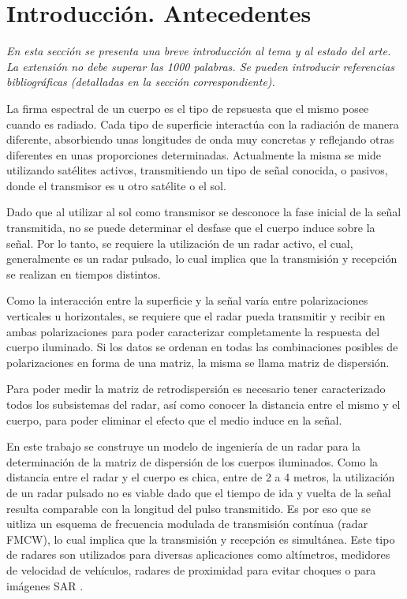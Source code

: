 \chapter{Introducción. Antecedentes} \label{ch:introduction}

\textit{En esta sección se presenta una breve introducción al tema y al estado del arte. La extensión no debe superar las 1000 palabras.
Se pueden introducir referencias bibliográficas (detalladas en la sección correspondiente).}

La firma espectral de un cuerpo es el tipo de repsuesta que el mismo posee cuando es radiado. Cada tipo de superficie interactúa con la radiación de manera diferente, absorbiendo unas longitudes de onda muy concretas y reflejando otras diferentes en unas proporciones determinadas. Actualmente la misma se mide utilizando satélites activos, transmitiendo un tipo de señal conocida, o pasivos, donde el transmisor es u otro satélite o el sol. 

Dado que al utilizar al sol como transmisor se desconoce la fase inicial de la señal transmitida, no se puede determinar el desfase que el cuerpo induce sobre la señal. Por lo tanto, se requiere la utilización de un radar activo, el cual, generalmente es un radar pulsado, lo cual implica que la transmisión y recepción se realizan en tiempos distintos.

Como la interacción entre la superficie y la señal varía entre polarizaciones verticales u horizontales, se requiere que el radar pueda transmitir y recibir en ambas polarizaciones para poder caracterizar completamente la respuesta del cuerpo iluminado. Si los datos se ordenan en todas las combinaciones posibles de polarizaciones en forma de una matriz, la misma se llama matriz de dispersión.

Para poder medir la matriz de retrodispersión es necesario tener caracterizado todos los subsistemas del radar, así como conocer la distancia entre el mismo y el cuerpo, para poder eliminar el efecto que el medio induce en la señal. 

En este trabajo se construye un modelo de ingeniería de un radar para la determinación de la matriz de dispersión de los cuerpos iluminados. Como la distancia entre el radar y el cuerpo es chica, entre de 2 a 4 metros, la utilización de un radar pulsado no es viable dado que el tiempo de ida y vuelta de la señal resulta comparable con la longitud del pulso transmitido. Es por eso que se uitliza un esquema de frecuencia modulada de transmisión contínua (radar FMCW), lo cual implica que la transmisión y recepción es simultánea. Este tipo de radares son utilizados para diversas aplicaciones como altímetros, medidores de velocidad de vehículos, radares de proximidad para evitar choques o para imágenes SAR \cite{Richards2010}.

